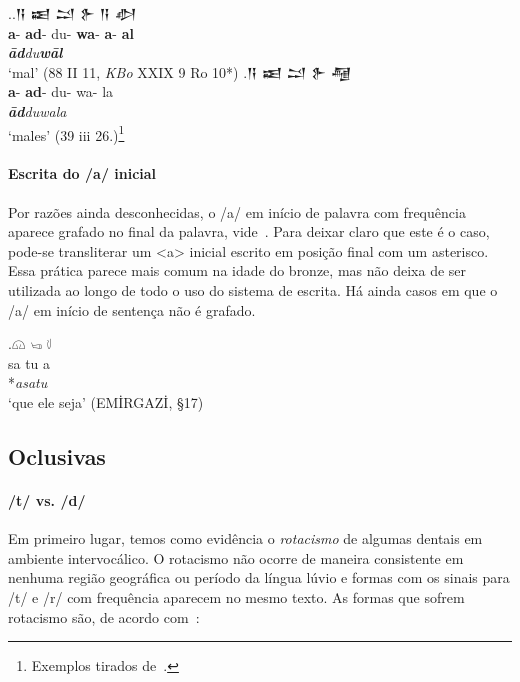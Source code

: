 \ex.\ag.\foreignlanguage{hittite}{𒀀} \foreignlanguage{hittite}{𒀜}
\foreignlanguage{hittite}{𒁺}  \foreignlanguage{hittite}{𒉿}
\foreignlanguage{hittite}{𒀀}  \foreignlanguage{hittite}{𒀠}\\
\textbf{a}- \textbf{ad}- du- \textbf{wa}- \textbf{a}- \textbf{al}\\
\emph{\textbf{ād}du\textbf{wāl}}\\
`mal' (88 II 11, \emph{KBo} XXIX 9 Ro 10*)
\bg.\foreignlanguage{hittite}{𒀀} \foreignlanguage{hittite}{𒀜}
\foreignlanguage{hittite}{𒁺}  \foreignlanguage{hittite}{𒉿}
\foreignlanguage{hittite}{𒆷}\\
\textbf{a}- \textbf{ad}- du- wa- la\\
\emph{\textbf{ād}duwala}\\
`males' (39 iii 26.)\footnote{Exemplos tirados de~\citet{Melchert1993}.}

\paragraph{Escrita do /a/ inicial} Por razões ainda desconhecidas, o /a/ em
início de palavra com frequência aparece grafado no final da palavra,
vide~\Next. Para deixar claro que este é o caso, pode-se transliterar um <a>
inicial escrito em posição final com um asterisco.
Essa prática parece mais comum na idade do bronze, mas não deixa de ser
utilizada ao longo de todo o uso do sistema de escrita.
Há ainda casos em que o /a/ em início de sentença não é grafado.

\exg.\Large 𔗔 \Large  𔑢 \Large 𔗷\\
sa tu a\\
*\emph{asatu}\\
`que ele seja' (EMİRGAZİ, §17)



\subsection{Oclusivas}

\paragraph{/t/ vs. /d/}
Em primeiro lugar, temos como evidência o \emph{rotacismo} de algumas dentais em
ambiente intervocálico.
O rotacismo não ocorre de maneira consistente em nenhuma região geográfica ou
período da língua lúvio e formas com os sinais para /t/ e /r/ com frequência
aparecem no mesmo texto.
As formas que sofrem rotacismo são, de acordo
com~\citet[249--50]{MorpurgoDavies1982}:

